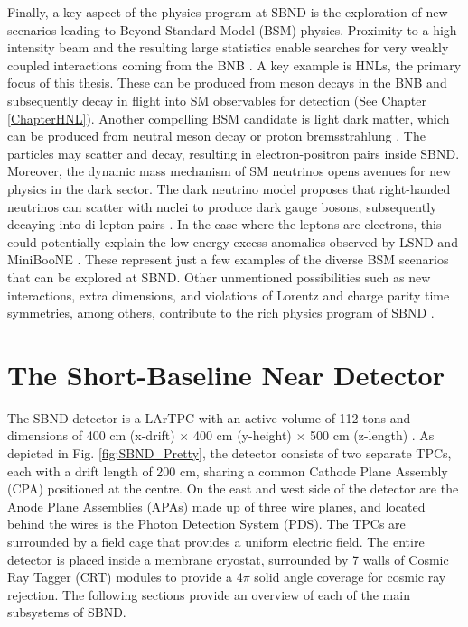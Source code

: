 Finally, a key aspect of the physics program at SBND is the exploration of new scenarios leading to Beyond Standard Model (BSM) physics. 
Proximity to a high intensity beam and the resulting large statistics enable searches for very weakly coupled interactions coming from the BNB \cite{SBNProgram}.
A key example is HNLs, the primary focus of this thesis.
These can be produced from meson decays in the BNB and subsequently decay in flight into SM observables for detection (See Chapter \ref{ChapterHNL}).
Another compelling BSM candidate is light dark matter, which can be produced from neutral meson decay or proton bremsstrahlung \cite{LightDarkMatter}. 
The particles may scatter and decay, resulting in electron-positron pairs inside SBND.
Moreover, the dynamic mass mechanism of SM neutrinos opens avenues for new physics in the dark sector. 
The dark neutrino model proposes that right-handed neutrinos can scatter with nuclei to produce dark gauge bosons, subsequently decaying into di-lepton pairs \cite{DarkNeutrino}. 
In the case where the leptons are electrons, this could potentially explain the low energy excess anomalies observed by LSND and MiniBooNE \cite{DarkNeutrinoLEE}.
These represent just a few examples of the diverse BSM scenarios that can be explored at SBND. 
Other unmentioned possibilities such as new interactions, extra dimensions, and violations of Lorentz and charge parity time symmetries, among others, contribute to the rich physics program of SBND \cite{SBNProgram}.

\section{The Short-Baseline Near Detector}
\label{sec4SBND}

The SBND detector is a LArTPC with an active volume of 112 tons and dimensions of 400 cm (x-drift) $\times$ 400 cm (y-height) $\times$ 500 cm (z-length) \cite{SBNProposal}.
As depicted in Fig. \ref{fig:SBND_Pretty}, the detector consists of two separate TPCs, each with a drift length of 200 cm, sharing a common Cathode Plane Assembly (CPA) positioned at the centre.
On the east and west side of the detector are the Anode Plane Assemblies (APAs) made up of three wire planes, and located behind the wires is the Photon Detection System (PDS).
The TPCs are surrounded by a field cage that provides a uniform electric field.
The entire detector is placed inside a membrane cryostat, surrounded by 7 walls of Cosmic Ray Tagger (CRT) modules to provide a 4$\pi$ solid angle coverage for cosmic ray rejection.
The following sections provide an overview of each of the main subsystems of SBND.

